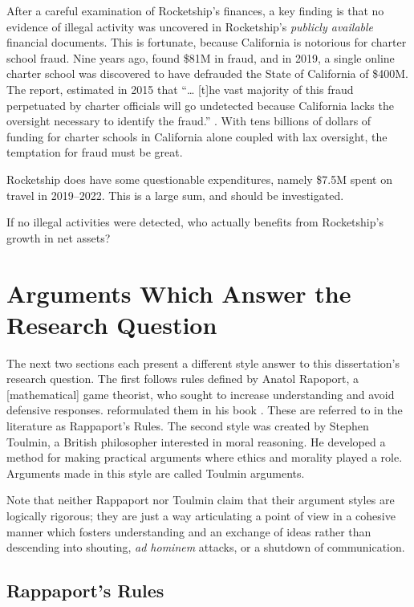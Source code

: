 After a careful examination of Rocketship's finances, a key finding is that no evidence of illegal activity was uncovered in Rocketship's \textit{publicly available} financial documents. This is fortunate, because California is notorious for charter school fraud. Nine years ago, \textcite{CPD2015} found \$81M in fraud, and in 2019, a single online charter school was discovered to have defrauded the State of California of \$400M. The report,  estimated in 2015 that ``\ldots{} [t]he vast majority of this fraud perpetuated by charter officials will go undetected because California lacks the oversight necessary to identify the fraud.'' \parencite[2]{CPD2015}. With tens billions of dollars of funding for charter schools in California alone coupled with lax oversight, the temptation for fraud must be great. 

Rocketship does have some questionable expenditures, namely \$7.5M spent on travel in 2019–2022. This is a large sum, and should be investigated.

If no illegal activities were detected,  who actually benefits from Rocketship's growth in net assets?

\section{Arguments Which Answer the Research Question}%
\label{sec:appr-answ-rese-quest}\indent%

The next two sections each present a different style answer to this dissertation's research question. The first follows rules defined by Anatol Rapoport, a [mathematical] game theorist, who sought to increase understanding and avoid defensive responses.  reformulated them in his book  \parencite{Dennett2013}. These are referred to in the literature as Rappaport's Rules. The second style was created by Stephen Toulmin, a British philosopher interested in moral reasoning. He developed a method for making practical arguments where ethics and morality played a role. Arguments made in this style are called Toulmin arguments.

Note that neither Rappaport nor Toulmin claim that their argument styles are logically rigorous; they are just a way articulating a point of view in a cohesive manner which fosters understanding and an exchange of ideas rather than descending into shouting, \textit{ad hominem} attacks, or a shutdown of communication.

\subsection{Rappaport's Rules}%
\label{sec:rappaports-rules}\indent%

